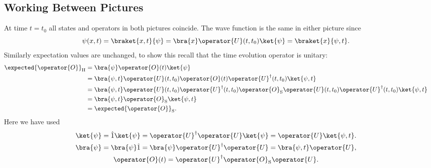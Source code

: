 \documentclass[fleqn]{NotesClass}
\newcommand*{\idop}{\hat{1}}
\newcommand*{\hermit}{\dagger}
\newcommand*{\schrodingerPicture}{\mathrm{S}}
\newcommand*{\heisenbergPicture}{\mathrm{H}}
\begin{document}
    \subsection{Working Between Pictures}
    At time \(t = t_0\) all states and operators in both pictures coincide.
    The wave function is the same in either picture since
    \begin{equation}
        \psi(x, t) = \braket{x, t}{\psi} = \bra{x}\operator{U}(t, t_0)\ket{\psi} = \braket{x}{\psi, t}.
    \end{equation}
    Similarly expectation values are unchanged, to show this recall that the time evolution operator is unitary:
    \begin{align}
        \expected{\operator{O}}_{\heisenbergPicture} &= \bra{\psi} \operator{O}(t) \ket{\psi}\\
        &= \bra{\psi, t} \operator{U}(t, t_0)\operator{O}(t) \operator{U}^\hermit(t, t_0) \ket{\psi, t}\\
        &= \bra{\psi, t} \operator{U}(t, t_0)\operator{U}^\hermit(t, t_0) \operator{O}_{\schrodingerPicture} \operator{U}(t, t_0)\operator{U}^\hermit(t, t_0) \ket{\psi, t}\\
        &= \bra{\psi, t} \operator{O}_{\schrodingerPicture} \ket{\psi, t}\\
        &= \expected{\operator{O}}_{\schrodingerPicture}.
    \end{align}
    Here we have used
    \begin{gather}
        \ket{\psi} = \idop\ket{\psi} =  \operator{U}^\hermit\operator{U}\ket{\psi} = \operator{U}\ket{\psi, t}.\\
        \bra{\psi} = \bra{\psi}\idop = \bra{\psi}\operator{U}^\hermit\operator{U} = \bra{\psi, t}\operator{U},\\
        \operator{O}(t) = \operator{U}^\hermit \operator{O}_{\schrodingerPicture}\operator{U}.
    \end{gather}
    
\end{document}

